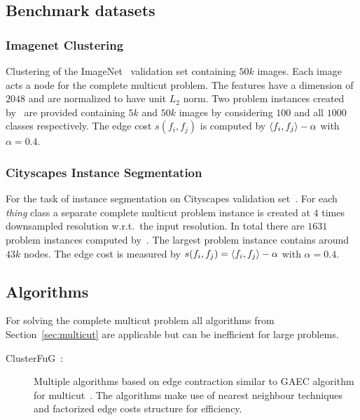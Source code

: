 \subsection{Benchmark datasets}

\subsubsection{Imagenet Clustering}
Clustering of the ImageNet~\cite{deng2009imagenet} validation set containing $50k$ images. Each image acts a node for the complete multicut problem. The features have a dimension of $2048$ and are normalized to have unit $L_2$ norm. Two problem instances created by~\cite{aabbas23_clusterfug} are provided containing $5k$ and $50k$ images by considering $100$ and all $1000$ classes respectively. The edge cost $s(f_i, f_j)$ is computed by $\langle f_i, f_j \rangle - \alpha$ with $\alpha = 0.4$.

\subsubsection{Cityscapes Instance Segmentation}
For the task of instance segmentation on Cityscapes validation set~\cite{cordts2016cityscapes}. For each \textit{thing} class a separate complete multicut problem instance is created at $4$ times downsampled resolution w.r.t.\ the input resolution. 
In total there are $1631$ problem instances computed by~\cite{aabbas23_clusterfug}. The largest problem instance contains around $43k$ nodes. The edge cost is measured by $s(f_i, f_j) = \langle f_i, f_j \rangle - \alpha$ with $\alpha = 0.4$.

\subsection{Algorithms}
For solving the complete multicut problem all algorithms from Section~\ref{sec:multicut} are applicable but can be inefficient for large problems. 
\begin{description}
\item[ClusterFuG~\cite{aabbas23_clusterfug}:] Multiple algorithms based on edge contraction similar to GAEC algorithm for multicut~\cite{keuper2015efficient}. The algorithms make use of nearest neighbour techniques and factorized edge costs structure for efficiency.
\end{description}
